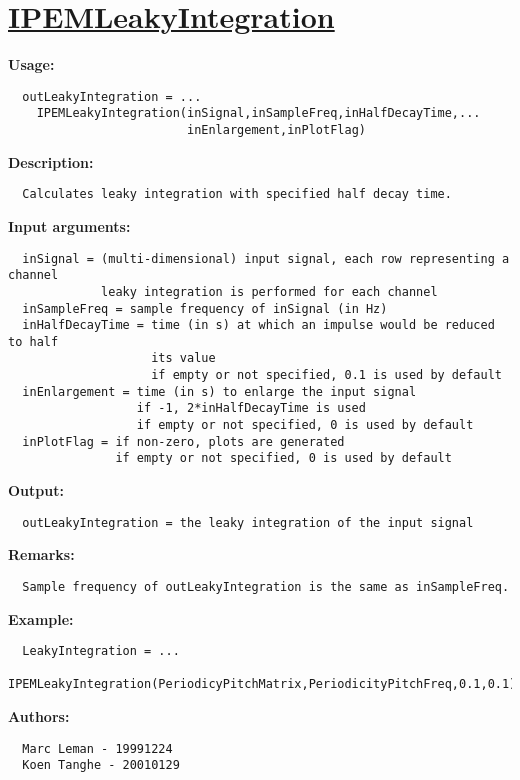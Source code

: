 \newpage
\section*{\hyperlink{Concepts:IPEMLeakyIntegration}{IPEMLeakyIntegration}}
\hypertarget{FuncRef:IPEMLeakyIntegration}{}

\textbf{Usage:}
\begin{verbatim}  outLeakyIntegration = ...
    IPEMLeakyIntegration(inSignal,inSampleFreq,inHalfDecayTime,...
                         inEnlargement,inPlotFlag)

\end{verbatim}
\textbf{Description:}
\begin{verbatim}  Calculates leaky integration with specified half decay time.

\end{verbatim}
\textbf{Input arguments:}
\begin{verbatim}  inSignal = (multi-dimensional) input signal, each row representing a channel
             leaky integration is performed for each channel
  inSampleFreq = sample frequency of inSignal (in Hz)
  inHalfDecayTime = time (in s) at which an impulse would be reduced to half
                    its value
                    if empty or not specified, 0.1 is used by default
  inEnlargement = time (in s) to enlarge the input signal
                  if -1, 2*inHalfDecayTime is used
                  if empty or not specified, 0 is used by default
  inPlotFlag = if non-zero, plots are generated
               if empty or not specified, 0 is used by default

\end{verbatim}
\textbf{Output:}
\begin{verbatim}  outLeakyIntegration = the leaky integration of the input signal

\end{verbatim}
\textbf{Remarks:}
\begin{verbatim}  Sample frequency of outLeakyIntegration is the same as inSampleFreq.

\end{verbatim}
\textbf{Example: }
\begin{verbatim}  LeakyIntegration = ...
    IPEMLeakyIntegration(PeriodicyPitchMatrix,PeriodicityPitchFreq,0.1,0.1);

\end{verbatim}
\textbf{Authors:}
\begin{verbatim}  Marc Leman - 19991224
  Koen Tanghe - 20010129
\end{verbatim}


